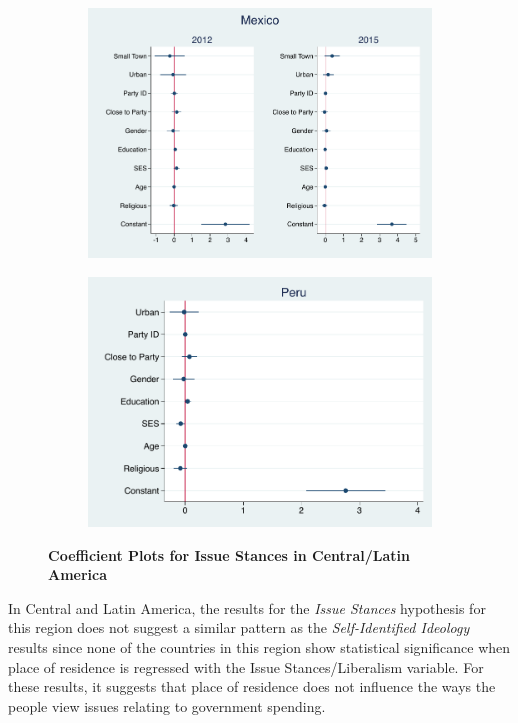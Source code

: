 \documentclass[12pt, titlepage]{article}
\newcommand\e{\emph}
\newcommand\tb{\textbf}
\begin{document}
\begin{figure}[H]
	\centering
	\begin{subfigure}[b]{0.475\textwidth}
		\centering
		\includegraphics[width=\textwidth]{LibCoef/Mexico}
	\end{subfigure}
	\hfill
	\begin{subfigure}[b]{0.475\textwidth}  
		\centering 
		\includegraphics[width=\textwidth]{LibCoef/Peru}
	\end{subfigure}
	\caption[ \tb{Issue Stances - Central/Latin America} ]
	{\tb {Coefficient Plots for Issue Stances in Central/Latin America} }
	\label{AmericaLibCoef}
\end{figure}

In Central and Latin America, the results for the \e{Issue Stances} hypothesis for this region does not suggest a similar pattern as the \e{Self-Identified Ideology} results since none of the countries in this region show statistical significance when place of residence is regressed with the Issue Stances/Liberalism variable. For these results, it suggests that place of residence does not influence the ways the people view issues relating to government spending.
\end{document}
